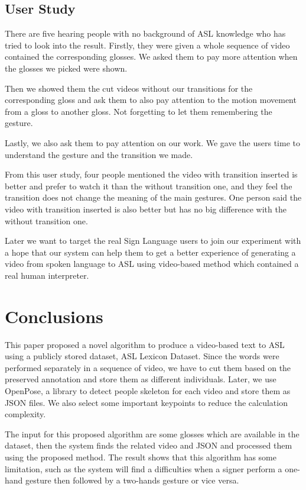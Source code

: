 \documentclass{sig-alternate-05-2015}
\begin{document}
\subsection{User Study}
There are five hearing people with no background of ASL knowledge who has tried to look into the result. Firstly, they were given a whole sequence of video contained the corresponding glosses. We asked them to pay more attention when the glosses we picked were shown.

Then we showed them the cut videos without our transitions for the corresponding gloss and ask them to also pay attention to the motion movement from a gloss to another gloss. Not forgetting to let them remembering the gesture.

Lastly, we also ask them to pay attention on our work. We gave the users time to understand the gesture and the transition we made.

From this user study, four people mentioned the video with transition inserted is better and prefer to watch it than the without transition one, and they feel the transition does not change the meaning of the main gestures. One person said the video with transition inserted is also better but has no big difference with the without transition one.

Later we want to target the real Sign Language users to join our experiment with a hope that our system can help them to get a better experience of generating a video from spoken language to ASL using video-based method which contained a real human interpreter.

\section{Conclusions}
This paper proposed a novel algorithm to produce a video-based text to ASL using a publicly stored dataset, ASL Lexicon Dataset. Since the words were performed separately in a sequence of video, we have to cut them based on the preserved annotation and store them as different individuals. Later, we use OpenPose, a library to detect people skeleton for each video and store them as JSON files. We also select some important keypoints to reduce the calculation complexity. 

The input for this proposed algorithm are some glosses which are available in the dataset, then the system finds the related video and JSON and processed them using the proposed method. The result shows that this algorithm has some limitation, such as the system will find a difficulties when a signer perform a one-hand gesture then followed by a two-hands gesture or vice versa. 
\end{document}
